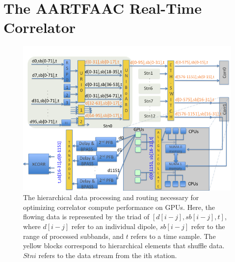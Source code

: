 \documentclass{ws-jai}
\begin{document}


\section {\label{sec:gpucorr} The AARTFAAC Real-Time Correlator}
\begin{figure}[htbp]
\centering
\includegraphics[width=1\textwidth]{Figs/data_routing_transform_hierarchy/Slide1.png}
\caption{The hierarchical  data processing and routing  necessary for optimizing
  correlator compute performance on GPUs.  Here, the flowing data is represented
  by the  triad of $[d[i-j],sb[i-j],t]$,  where $d[i-j]$ refer to  an individual
  dipole, $sb[i-j]$ refer to the range  of processed subbands, and $t$ refers to
  a time  sample.  The  yellow blocks correspond  to hierarchical  elements that
  shuffle data.$Stni$ refers to the data stream from the ith station.}
\label{fig:afaac_station_hw}
\end{figure}
\end{document}
